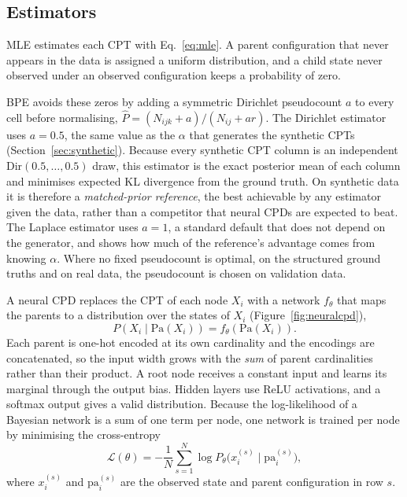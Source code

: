 \documentclass[a4paper,fleqn]{cas-dc}
\newcommand{\Pa}{\mathrm{Pa}}
\begin{document}
\subsection{Estimators}\label{sec:estimators}\label{sec:archsel}

MLE estimates each CPT with Eq.~\eqref{eq:mle}. A parent configuration that never appears in the data is assigned a uniform distribution, and a child state never observed under an observed configuration keeps a probability of zero.

BPE avoids these zeros by adding a symmetric Dirichlet pseudocount $a$ to every cell before normalising, $\hat P = (N_{ijk}+a)/(N_{ij}+ar)$. The Dirichlet estimator uses $a=0.5$, the same value as the $\alpha$ that generates the synthetic CPTs (Section~\ref{sec:synthetic}). Because every synthetic CPT column is an independent $\mathrm{Dir}(0.5,\dots,0.5)$ draw, this estimator is the exact posterior mean of each column and minimises expected KL divergence from the ground truth. On synthetic data it is therefore a \emph{matched-prior reference}, the best achievable by any estimator given the data, rather than a competitor that neural CPDs are expected to beat. The Laplace estimator uses $a=1$, a standard default that does not depend on the generator, and shows how much of the reference's advantage comes from knowing $\alpha$. Where no fixed pseudocount is optimal, on the structured ground truths and on real data, the pseudocount is chosen on validation data.

A neural CPD replaces the CPT of each node $X_i$ with a network $f_\theta$ that maps the parents to a distribution over the states of $X_i$ (Figure~\ref{fig:neuralcpd}),
\begin{equation*}
P(X_i\mid\Pa(X_i))=f_\theta(\Pa(X_i)).
\end{equation*}
Each parent is one-hot encoded at its own cardinality and the encodings are concatenated, so the input width grows with the \emph{sum} of parent cardinalities rather than their product. A root node receives a constant input and learns its marginal through the output bias. Hidden layers use ReLU activations, and a softmax output gives a valid distribution. Because the log-likelihood of a Bayesian network is a sum of one term per node, one network is trained per node by minimising the cross-entropy
\begin{equation*}
\mathcal{L}(\theta)=-\frac{1}{N}\sum_{s=1}^{N}\log P_\theta\big(x_i^{(s)} \mid \mathrm{pa}_i^{(s)}\big),
\end{equation*}
where $x_i^{(s)}$ and $\mathrm{pa}_i^{(s)}$ are the observed state and parent configuration in row $s$.
\end{document}
